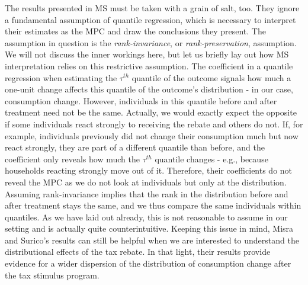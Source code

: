 The results presented in MS must be taken with a grain of salt, too. They ignore a fundamental assumption of quantile regression, which is necessary to interpret their estimates as the MPC and draw the conclusions they present. The assumption in question is the \textit{rank-invariance}, or \textit{rank-preservation}, assumption. We will not discuss the inner workings here, but let us briefly lay out how MS interpretation relies on this restrictive assumption. The coefficient in a quantile regression when estimating the $\tau^{th}$ quantile of the outcome signals how much a one-unit change affects this quantile of the outcome's distribution - in our case, consumption change. However, individuals in this quantile before and after treatment need not be the same. Actually, we would exactly expect the opposite if some individuals react strongly to receiving the rebate and others do not. If, for example, individuals previously did not change their consumption much but now react strongly, they are part of a different quantile than before, and the coefficient only reveals how much the $\tau^{th}$ quantile changes - e.g., because households reacting strongly move out of it. Therefore, their coefficients do not reveal the MPC as we do not look at individuals but only at the distribution. Assuming rank-invariance implies that the rank in the distribution before and after treatment stays the same, and we thus compare the same individuals within quantiles. As we have laid out already, this is not reasonable to assume in our setting and is actually quite counterintuitive. Keeping this issue in mind, Misra and Surico's results can still be helpful when we are interested to understand the distributional effects of the tax rebate. In that light, their results provide evidence for a wider dispersion of the distribution of consumption change after the tax stimulus program.